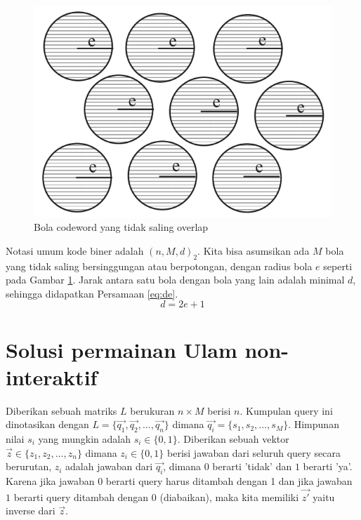 \documentclass[conference,compsoc]{IEEEtran}
\newcommand{\refeq}[1]{Persamaan \ref{#1}}
\begin{document}
\begin{figure}
\centering
\includegraphics[width=\linewidth]{../img/codewordsball.png}
\caption{Bola codeword yang tidak saling overlap}
\label{fig:codewordsball}
\end{figure}

Notasi umum kode biner adalah $(n,M,d)_2$. Kita bisa asumsikan ada $M$ bola yang tidak saling bersinggungan atau berpotongan, dengan radius bola $e$ seperti pada Gambar \ref{fig:codewordsball}. Jarak antara satu bola dengan bola yang lain adalah minimal $d$, sehingga didapatkan \refeq{eq:de}.
\begin{equation} \label{eq:de}
d = 2e + 1
\end{equation}


\section{Solusi permainan Ulam non-interaktif}

Diberikan sebuah matriks $L$ berukuran $n \times M$ berisi $n$. Kumpulan query ini dinotasikan dengan $L = \{\vec{q_1},\vec{q_2},\ldots,\vec{q_n}\}$ dimana $\vec{q_i} = \{s_1,s_2,\ldots,s_M\}$. Himpunan nilai $s_i$ yang mungkin adalah $s_i \in \{0,1\}$. Diberikan sebuah vektor $\vec{z} \in \{z_1,z_2,\ldots,z_n\}$ dimana $z_i \in \{0,1\}$ berisi jawaban dari seluruh query secara berurutan, $z_i$ adalah jawaban dari $\vec{q_i}$, dimana $0$ berarti 'tidak' dan $1$ berarti 'ya'. Karena jika jawaban $0$ berarti query harus ditambah dengan 1 dan jika jawaban $1$ berarti query ditambah dengan 0 (diabaikan), maka kita memiliki $\vec{z'}$ yaitu inverse dari $\vec{z}$. 
\end{document}
